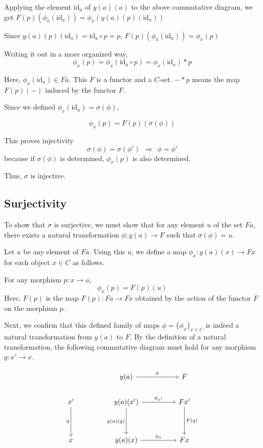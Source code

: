 \documentclass[uplatex,a4j,12pt,dvipdfmx]{jsarticle}
\begin{document}
Applying the element $\text{id}_{a}$ of $y(a)(a)$ to the above commutative diagram, we get
$F(p)(\phi_{a}(\text{id}_{a})) = \phi_{x}(y(a)(p)(\text{id}_{a}))$

Since $y(a)(p)(\text{id}_{a}) = \text{id}_{a} \circ p = p$,
$F(p)(\phi_{a}(\text{id}_{a})) = \phi_{x}(p)$

Writing it out in a more organized way,
\[
	\phi_{x}(p) = \phi_{x}( \text{id}_{a} \circ p) = \phi_{x}( \text{id}_{a} ) * p
\]

Here, $\phi_{x}( \text{id}_{a} ) \in Fa$. This $F$ is a functor and a $C$-set.
$-*p$ means the map $F(p)(-)$ induced by the functor $F$.

Since we defined $\phi_{x}( \text{id}_{a} ) = \sigma(\phi)$,

\[
	\phi_{x}(p) = F(p)(\sigma(\phi))
\]

This proves injectivity
\[
	\sigma(\phi) = \sigma(\phi') \ \ \Rightarrow \ \ \phi = \phi'
\]
because if $\sigma(\phi)$ is determined, $\phi_{x}(p)$ is also determined.

Thus, $\sigma$ is injective.



\subsection{Surjectivity}

To show that $\sigma$ is surjective, we must show that for any element $u$ of the set $Fa$, there exists a natural transformation $\phi: y(a) \to F$ such that $\sigma(\phi) = u$.

Let $u$ be any element of $Fa$. Using this $u$, we define a map $\phi_x : y(a)(x) \to Fx$ for each object $x \in C$ as follows.

For any morphism $p: x \to a$,
$$ \phi_x(p) = F(p)(u) $$
Here, $F(p)$ is the map $F(p): Fa \to Fx$ obtained by the action of the functor $F$ on the morphism $p$.

Next, we confirm that this defined family of maps $\phi = \{\phi_x\}_{x \in C}$ is indeed a natural transformation from $y(a)$ to $F$. By the definition of a natural transformation, the following commutative diagram must hold for any morphism $q: x' \to x$.

\[
	\begin{tikzcd}
		&  & y(a) \arrow[rr, "\phi"]              &  & F                  \\
		x' \arrow[dd, "q"'] &  & y(a)(x') \arrow[dd, "y(a)(q)"'] \arrow[rr, "\phi_{x'}"] &  & Fx' \arrow[dd, "F(q)"] \\
		&  &                                  &  &                    \\
		x                  &  & y(a)(x) \arrow[rr, "\phi_{x}"]     &  & Fx
	\end{tikzcd}
\]
\end{document}
